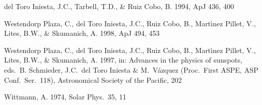 \documentclass[11pt]{report}
\begin{document}
\begin{thebibliography}{99}
\bibitem{} del Toro Iniesta, J.C., Tarbell, T.D., \& Ruiz Cobo, B. 1994, ApJ 436, 400

\bibitem{} Westendorp Plaza, C., del Toro Iniesta, J.C., Ruiz Cobo, B., Mart\'{\i}nez Pillet, V., Lites, B.W., \& Skumanich, A. 1998, ApJ 494, 453

\bibitem{} Westendorp Plaza, C., del Toro Iniesta, J.C., Ruiz Cobo, B.,
Mart\'{\i}nez Pillet, V., Lites, B.W., \& Skumanich, A. 1997, in:
Advances in the physics of sunspots, eds.\ B. Schmieder, J.C.\ del Toro
Iniesta \& M.\ V\'azquez (Proc.\ First ASPE, ASP Conf.\  Ser.\ 118),
Astronomical Society of the Pacific, 202

\bibitem{} Wittmann, A. 1974, Solar Phys.\ 35, 11

\end{thebibliography}
\end{document}
